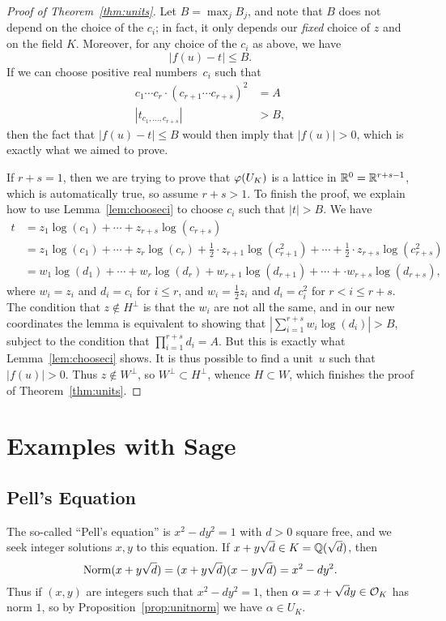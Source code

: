 \begin{proof}[Proof of Theorem~\ref{thm:units}]
Let $B=\max_{j} B_j$, and note that $B$ does not depend on the choice
of the $c_i$; in fact, it only depends our {\em fixed} choice of $z$ and on the field $K$.
Moreover, for any choice of the $c_i$ as above, we have
$$
  |f(u) - t| \leq B.
$$
If we can choose positive real numbers~$c_i$ such that
\begin{align*}
 c_1\cdots c_r\cdot (c_{r+1}\cdots c_{r+s})^2 &= A\\
  |t_{c_1,\ldots, c_{r+s}}| &>B,
\end{align*}
then the fact that $|f(u)-t|\leq B$ would then imply that $|f(u)|>0$,
which is exactly what we aimed to prove.

If $r+s=1$, then we are trying to prove that $\varphi(U_K)$ is a lattice
in $\mathbb{R}^0=\mathbb{R}^{r+s-1}$, which is automatically true, so assume $r+s>1$.
To finish the proof, we explain how to use Lemma~\ref{lem:chooseci}
to choose $c_i$ such that $|t|>B$.  We have
\begin{align*}
t &= z_1\log(c_1)+\cdots +z_{r+s}\log(c_{r+s})\\
&= z_1\log(c_1)+\cdots +  z_r\log(c_r)+
\frac{1}{2}\cdot z_{r+1}\log(c_{r+1}^2) +
\cdots + \frac{1}{2}\cdot z_{r+s}\log(c_{r+s}^2)\\
&=w_1\log(d_1)+\cdots +  w_r\log(d_r)+
w_{r+1}\log(d_{r+1}) +
\cdots +\cdot w_{r+s}\log(d_{r+s}),
\end{align*}
where $w_i=z_i$ and $d_i=c_i$ for $i\leq r$, and
$w_i=\frac{1}{2}z_i$ and $d_i=c_i^2$ for $r<i\leq r+s$.
The condition that $z\not\in H^{\perp}$ is that the $w_i$ are not all
the same,
 and in our new coordinates the lemma is equivalent to
showing that $|\sum_{i=1}^{r+s} w_i \log(d_i)|>B$, subject to the
condition that $\prod_{i=1}^{r+s} d_i = A$.
But this is exactly what Lemma~\ref{lem:chooseci} shows.
It is thus possible
to find a unit~$u$ such that $|f(u)|>0$.  Thus $z\not\in
W^{\perp}$, so $W^{\perp}\subset H^{\perp}$, whence $H\subset W$,
which finishes the proof of Theorem~\ref{thm:units}.
\end{proof}

\section{Examples with Sage}


\subsection{Pell's Equation}\label{sec:pell}
The so-called ``Pell's equation'' is $x^2-dy^2 = 1$ with $d>0$ square
free, and we seek integer solutions $x,y$ to this equation.  If
$x+y\sqrt{d}\in K = \mathbb{Q}(\sqrt{d})$, then
$$
	\operatorname{Norm}(x+y\sqrt{d}) = (x+y\sqrt{d})(x-y\sqrt{d}) = x^2 -dy^2.
$$
Thus if $(x,y)$ are integers such that $x^2 - d y^2 = 1$, then $\alpha
= x + \sqrt{d}y \in \mathcal{O}_K$ has norm $1$, so by
Proposition~\ref{prop:unitnorm} we have $\alpha \in U_K$.

